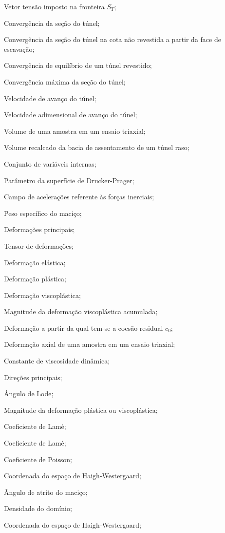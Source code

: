 \item[$ \Tl^d $] 		Vetor tensão imposto na fronteira $S_T$;
\item[$ U $] 			Convergência da seção do túnel;
\item[$ U_{0} $] 		Convergência da seção do túnel na cota não revestida a partir da face de escavação;
\item[$ U_{eq} $] 		Convergência de equilíbrio de um túnel revestido;
\item[$ U_{max} $] 		Convergência máxima da seção do túnel;
\item[$ V $] 			Velocidade de avanço do túnel;
\item[$ V^* $] 			Velocidade adimensional de avanço do túnel;
\item[$ V_a $] 			Volume de uma amostra em um ensaio triaxial;
\item[$ V_{bacia} $]	Volume recalcado da bacia de assentamento de um túnel raso;

\item[\textbf{Grego minúsculo:}]
\item[$\alphal$] Conjunto de variáveis internas;
\item[$\beta$] Parâmetro da superfície de Drucker-Prager;
\item[$ \gammal $] 		Campo de acelerações referente às forças inerciais;
\item[$\gamma_m$] 		Peso específico do maciço;
\item[$\varepsilon_1,\varepsilon_2,\varepsilon_3$] 	Deformações principais;
\item[$ \varepsilonll $] 	Tensor de deformações;
\item[$\varepsilonll^e$] Deformação elástica;
\item[$\varepsilonll^p$] Deformação plástica;
\item[$\varepsilonll^{vp}$] Deformação viscoplástica;
\item[$\bar{\varepsilon}^{vp}$] Magnitude da deformação viscoplástica acumulada;
\item[$ \varepsilon_0 $] Deformação a partir da qual tem-se a coesão residual $c_0$;
\item[$ \varepsilon_a $] Deformação axial de uma amostra em um ensaio triaxial;
\item[$ \eta $] 		Constante de viscosidade dinâmica;
\item[$\eta_1,\eta_2,\eta_3$] 	Direções principais;
\item[$ \theta $] 		Ângulo de Lode;
\item[$\lambda$] 	Magnitude da deformação plástica ou viscoplástica;
\item[$\lambda^e$] 	Coeficiente de Lamè;
\item[$\mu^e$] 	Coeficiente de Lamè;
\item[$ \nu $] 			Coeficiente de Poisson;
\item[$ \xi_{H} $] 				Coordenada do espaço de Haigh-Westergaard;
\item[$ \phi $] 		Ângulo de atrito do maciço;
\item[$ \rho $] 		Densidade do domínio;
\item[$ \rho_{H} $] 		Coordenada do espaço de Haigh-Westergaard;

